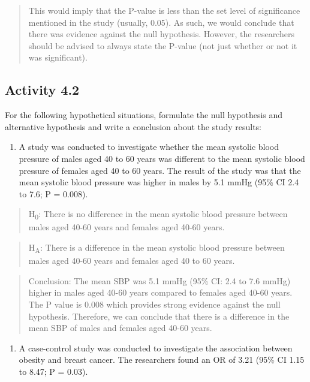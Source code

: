 \documentclass[
]{memoir}
\providecommand{\tightlist}{%
  \setlength{\itemsep}{0pt}\setlength{\parskip}{0pt}}
\begin{document}
\begin{quote}
This would imply that the P-value is less than the set level of significance mentioned in the study (usually, 0.05). As such, we would conclude that there was evidence against the null hypothesis. However, the researchers should be advised to always state the P-value (not just whether or not it was significant).
\end{quote}

\hypertarget{activity-4.2}{%
\subsection*{Activity 4.2}\label{activity-4.2}}

For the following hypothetical situations, formulate the null hypothesis and alternative hypothesis and write a conclusion about the study results:

\begin{enumerate}
\def\labelenumi{\alph{enumi})}
\tightlist
\item
  A study was conducted to investigate whether the mean systolic blood pressure of males aged 40 to 60 years was different to the mean systolic blood pressure of females aged 40 to 60 years. The result of the study was that the mean systolic blood pressure was higher in males by 5.1 mmHg (95\% CI 2.4 to 7.6; P = 0.008).
\end{enumerate}

\begin{quote}
H\textsubscript{0}: There is no difference in the mean systolic blood pressure between males aged 40-60 years and females aged 40-60 years.
\end{quote}

\begin{quote}
H\textsubscript{A}: There is a difference in the mean systolic blood pressure between males aged 40-60 years and females aged 40 to 60 years.
\end{quote}

\begin{quote}
Conclusion: The mean SBP was 5.1 mmHg (95\% CI: 2.4 to 7.6 mmHg) higher in males aged 40-60 years compared to females aged 40-60 years. The P value is 0.008 which provides strong evidence against the null hypothesis. Therefore, we can conclude that there is a difference in the mean SBP of males and females aged 40-60 years.
\end{quote}

\begin{enumerate}
\def\labelenumi{\alph{enumi})}
\setcounter{enumi}{1}
\tightlist
\item
  A case-control study was conducted to investigate the association between obesity and breast cancer. The researchers found an OR of 3.21 (95\% CI 1.15 to 8.47; P = 0.03).
\end{enumerate}
\end{document}
